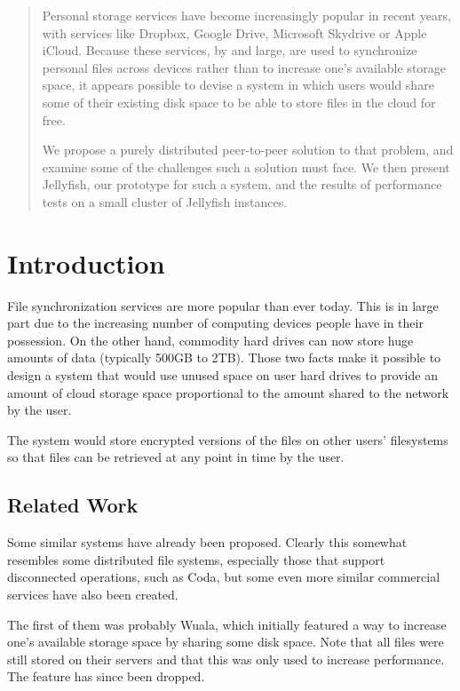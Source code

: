 \documentclass[11pt]{IEEEtran}
\begin{document}
\begin{abstract}
Personal storage services have become increasingly popular in recent years, with services like Dropbox, Google Drive, Microsoft Skydrive or Apple iCloud\cite{dropbox, drive, skydrive, icloud}. Because these services, by and large, are used to synchronize personal files across devices rather than to increase one's available storage space, it appears possible to devise a system in which users would share some of their existing disk space to be able to store files in the cloud for free.

We propose a purely distributed peer-to-peer solution to that problem, and examine some of the challenges such a solution must face. We then present Jellyfish, our prototype for such a system, and the results of performance tests on a small cluster of Jellyfish instances.
\end{abstract}

\section{Introduction}

File synchronization services are more popular than ever today. This is in large part due to the increasing number of computing devices people have in their possession. On the other hand, commodity hard drives can now store huge amounts of data (typically 500GB to 2TB). Those two facts make it possible to design a system that would use unused space on user hard drives to provide an amount of cloud storage space proportional to the amount shared to the network by the user. 

The system would store encrypted versions of the files on other users' filesystems so that files can be retrieved at any point in time by the user.

\subsection{Related Work}

Some similar systems have already been proposed. Clearly this somewhat resembles some distributed file systems, especially those that support disconnected operations, such as Coda\cite{coda}, but some even more similar commercial services have also been created.

The first of them was probably Wuala\cite{wuala:measurement}, which initially featured a way to increase one's available storage space by sharing some disk space. Note that all files were still stored on their servers and that this was only used to increase performance. The feature has since been dropped.
\end{document}
